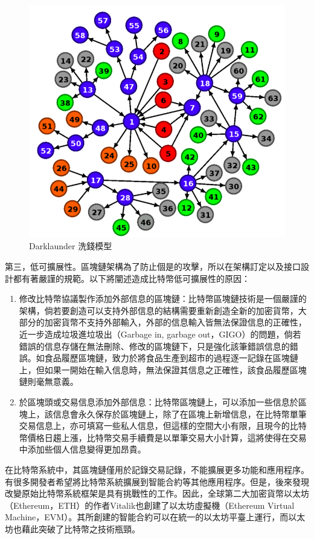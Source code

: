 					\begin{figure}[htbp]
						\centering
						\includegraphics[width = .7\textwidth]{Darklaunderworkflow.png}
						\caption{Darklaunder 洗錢模型\supercite{AnAnalysisofBitcoinLaundryServices}}\label{Darklaunderworkflow}
					\end{figure}

				第三，低可擴展性。區塊鏈架構為了防止個是的攻擊，所以在架構訂定以及接口設計都有著嚴謹的規範。以下將闡述造成比特幣低可擴展性的原因：

					\begin{enumerate}

						\item 修改比特幣協議製作添加外部信息的區塊鏈：比特幣區塊鏈技術是一個嚴謹的架構，倘若要創造可以支持外部信息的結構需要重新創造全新的加密貨幣，大部分的加密貨幣不支持外部輸入，外部的信息輸入皆無法保證信息的正確性，近一步造成垃圾進垃圾出（Garbage in, garbage out，GIGO）的問題，倘若錯誤的信息存儲在無法刪除、修改的區塊鏈下，只是強化該筆錯誤信息的錯誤。如食品履歷區塊鏈，致力於將食品生產到超市的過程逐一記錄在區塊鏈上，但如果一開始在輸入信息時，無法保證其信息之正確性，該食品履歷區塊鏈則毫無意義。

						\item 於區塊頭或交易信息添加外部信息：比特幣區塊鏈上，可以添加一些信息於區塊上，該信息會永久保存於區塊鏈上，除了在區塊上新增信息，在比特幣單筆交易信息上，亦可填寫一些私人信息，但這樣的空間大小有限，且現今的比特幣價格日趨上漲，比特幣交易手續費是以單筆交易大小計算，這將使得在交易中添加些個人信息變得更加昂貴。

					\end{enumerate}

				在比特幣系統中，其區塊鏈僅用於記錄交易記錄，不能擴展更多功能和應用程序。有很多開發者希望將比特幣系統擴展到智能合約等其他應用程序。但是，後來發現改變原始比特幣系統框架是具有挑戰性的工作。因此，全球第二大加密貨幣以太坊（Ethereum，ETH）的作者Vitalik也創建了以太坊虛擬機（Ethereum Virtual Machine，EVM）。其所創建的智能合約可以在統一的以太坊平臺上運行，而以太坊也藉此突破了比特幣之技術瓶頸。
	
